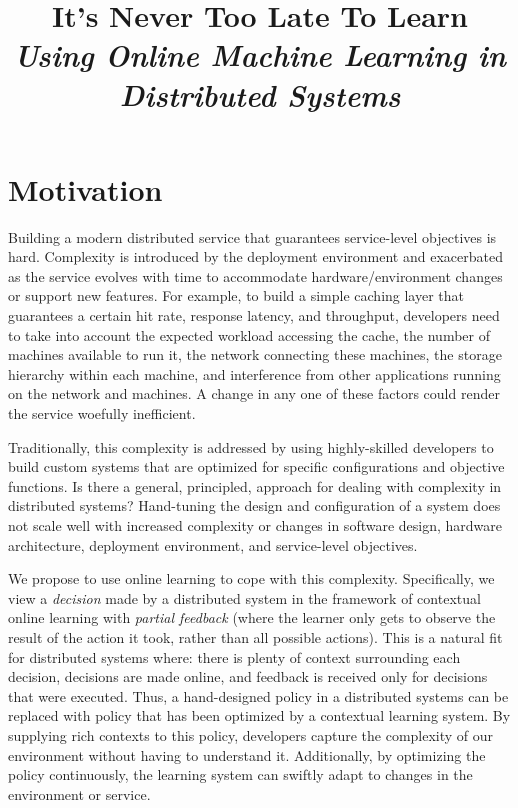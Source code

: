 \documentclass[a4paper,twocolumn]{article}
\title{
  It's Never Too Late To Learn\\
  \emph{Using Online Machine Learning in Distributed Systems}
}
\author{}
\date{}
\begin{document}
\maketitle

\section{Motivation}

Building a modern distributed service that guarantees service-level objectives
is hard. Complexity is introduced by the deployment environment and exacerbated
as the service evolves with time to accommodate hardware/environment changes or
support new features.
For example, to build a simple caching layer that guarantees a certain hit rate,
response latency, and throughput, developers need to take into account the
expected workload accessing the cache, the number of machines available to run
it, the network connecting these machines, the storage hierarchy within each
machine, and interference from other applications running on the network and
machines.  A change in any one of these factors could render the service
woefully inefficient.

Traditionally, this complexity is addressed by using highly-skilled developers
to build custom systems that are optimized for specific configurations and
objective functions.  Is there a general, principled, approach for dealing with
complexity in distributed systems? Hand-tuning the design and configuration of a
system does not scale well with increased complexity or changes in software
design, hardware architecture, deployment environment, and service-level
objectives.

We propose to use online learning to cope with this complexity. Specifically, we
view a {\em decision} made by a distributed system in the framework of
contextual online learning with {\em partial feedback} (where the learner only
gets to observe the result of the action it took, rather than all possible
actions). This is a natural fit for distributed systems where: there is plenty
of context surrounding each decision, decisions are made online, and feedback is
received only for decisions that were executed.  Thus, a hand-designed policy in
a distributed systems can be replaced with policy that has been optimized by a
contextual learning system. By supplying rich contexts to this policy,
developers capture the complexity of our environment without having to
understand it. Additionally, by optimizing the policy continuously, the learning
system can swiftly adapt to changes in the environment or service.
\end{document}
